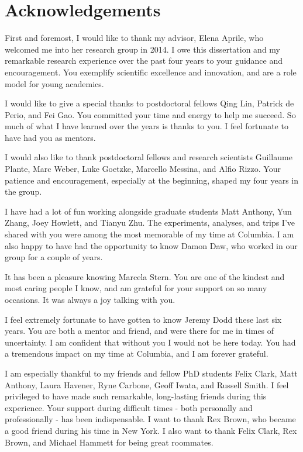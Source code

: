 
\cleartorecto %
\chapter{Acknowledgements} %
\thispagestyle{plain} %

First and foremost, I would like to thank my advisor, Elena Aprile, who welcomed me into her research group in 2014.  I owe this dissertation
and my remarkable research experience over the past four years to your guidance and encouragement.  You exemplify scientific excellence and
innovation, and are a role model for young academics.

I would like to give a special thanks to postdoctoral fellows Qing Lin, Patrick de Perio, and Fei Gao.  You committed your time and energy to
help me succeed.  So much of what I have learned over the years is thanks to you.  I feel fortunate to have had you as mentors.

I would also like to thank postdoctoral fellows and research scientists Guillaume Plante, Marc Weber, Luke Goetzke, Marcello Messina, and
Alfio Rizzo.  Your patience and encouragement, especially at the beginning, shaped my four years in the group.

I have had a lot of fun working alongside graduate students Matt Anthony, Yun Zhang, Joey Howlett, and Tianyu Zhu.  The experiments,
analyses, and trips I've shared with you were among the most memorable of my time at Columbia.  I am also happy to have had the
opportunity to know Damon Daw, who worked in our group for a couple of years.

It has been a pleasure knowing Marcela Stern.  You are one of the kindest and most caring people I know, and am grateful for your support
on so many occasions.  It was always a joy talking with you.

I feel extremely fortunate to have gotten to know Jeremy Dodd these last six years.  You are both a mentor and friend, and were there for me
in times of uncertainty.  I am confident that without you I would not be here today.  You had a tremendous impact on my time at Columbia, and
I am forever grateful.

I am especially thankful to my friends and fellow PhD students Felix Clark, Matt Anthony, Laura Havener, Ryne Carbone, Geoff Iwata, and
Russell Smith.  I feel privileged to have made such remarkable, long-lasting friends during this experience.  Your support during
difficult times - both personally and professionally - has been indispensable.  I want to thank Rex Brown, who became a good friend
during his time in New York.  I also want to thank Felix Clark, Rex Brown, and Michael Hammett for being great roommates.

